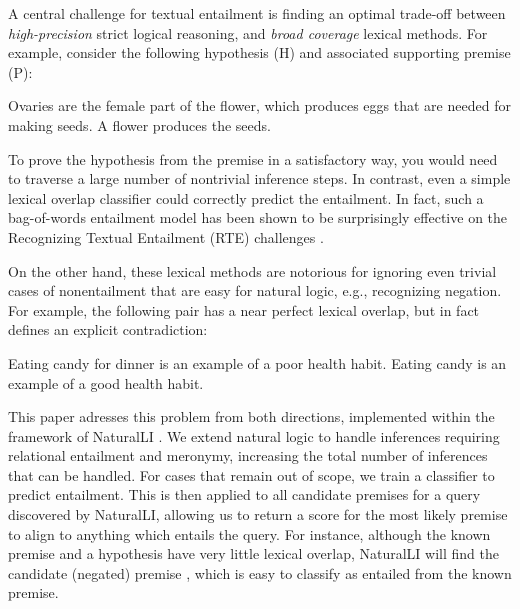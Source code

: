 A central challenge for textual entailment is finding an optimal trade-off between
  \textit{high-precision} strict logical reasoning, and \textit{broad coverage}
  lexical methods.
For example, consider the following hypothesis (H) and associated supporting premise (P):

\entailmentExample
{Ovaries are the female part of the flower, which produces eggs that are needed for making seeds.}
{A flower produces the seeds.}

To prove the hypothesis from the premise in a satisfactory way, you would need
  to traverse a large number of nontrivial inference steps.
In contrast, even a simple lexical overlap classifier could correctly predict
  the entailment.
In fact, such a bag-of-words entailment model has been shown to be surprisingly
  effective on the Recognizing Textual Entailment (RTE) challenges 
  \cite{key:2009maccartney-thesis}.

On the other hand, these lexical methods are notorious for ignoring even trivial 
  cases of nonentailment that are easy for natural logic, e.g., recognizing negation.
For example, the following pair has a near perfect lexical overlap, but in fact defines
  an explicit contradiction:

\entailmentExample
{Eating candy for dinner is an example of a poor health habit.}
{Eating candy is an example of a good health habit.}


This paper adresses this problem from both directions, implemented within the
  framework of NaturalLI \cite{key:2014angeli-naturalli}.
We extend natural logic to handle inferences requiring relational entailment 
  and meronymy, increasing the total number of inferences that can be handled.
For cases that remain out of scope, we train a classifier to predict 
  entailment.
This is then applied to all candidate premises for a query discovered by 
  NaturalLI, allowing us to return a score for the most likely premise to
  align to anything which entails the query.
For instance, although the known premise  
  and a hypothesis  
  have very little lexical overlap, NaturalLI
  will find the candidate (negated) premise ,
  which is easy to classify as entailed from the known premise.
  
